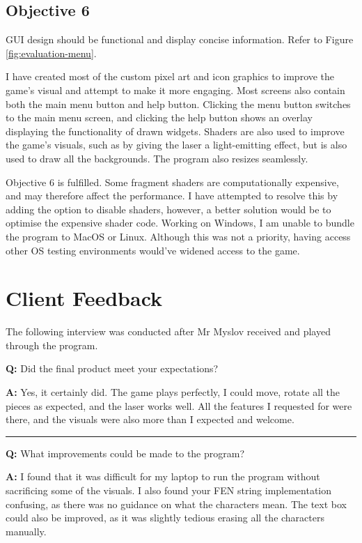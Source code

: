 \documentclass[../main/main.tex]{subfiles}
\begin{document}
\subsection{Objective 6}
GUI design should be functional and display concise information. Refer to Figure \ref{fig:evaluation-menu}.

I have created most of the custom pixel art and icon graphics to improve the game's visual and attempt to make it more engaging. Most screens also contain both the main menu button and help button. Clicking the menu button switches to the main menu screen, and clicking the help button shows an overlay displaying the functionality of drawn widgets. Shaders are also used to improve the game's visuals, such as by giving the laser a light-emitting effect, but is also used to draw all the backgrounds. The program also resizes seamlessly.

Objective 6 is fulfilled. Some fragment shaders are computationally expensive, and may therefore affect the performance. I have attempted to resolve this by adding the option to disable shaders, however, a better solution would be to optimise the expensive shader code. Working on Windows, I am unable to bundle the program to MacOS or Linux. Although this was not a priority, having access other OS testing environments would've widened access to the game.

\section{Client Feedback}
The following interview was conducted after Mr Myslov received and played through the program.

\bigskip

\noindent\textbf{Q:} Did the final product meet your expectations?

\noindent\textbf{A:} Yes, it certainly did. The game plays perfectly, I could move, rotate all the pieces as expected, and the laser works well. All the features I requested for were there, and the visuals were also more than I expected and welcome.

\noindent\rule{\textwidth}{0.4pt}

\noindent\textbf{Q:} What improvements could be made to the program?

\noindent\textbf{A:} I found that it was difficult for my laptop to run the program without sacrificing some of the visuals. I also found your FEN string implementation confusing, as there was no guidance on what the characters mean. The text box could also be improved, as it was slightly tedious erasing all the characters manually.
\end{document}
